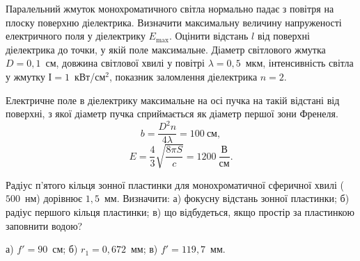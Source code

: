 \begin{problem}%
    Паралельний жмуток монохроматичного світла нормально падає з повітря на плоску поверхню діелектрика. Визначити максимальну величину напруженості електричного поля у діелектрику $E_{\max}$. Оцінити відстань $l$ від поверхні діелектрика до точки, у якій поле максимальне. Діаметр світлового жмутка $D = 0,1$~см, довжина світлової хвилі у повітрі $\lambda = 0,5$~мкм, інтенсивність світла у жмутку $І = 1$~кВт/см$^2$, показник заломлення діелектрика $n = 2$.
    \begin{solution}
        Електричне поле в діелектрику максимальне на осі пучка на такій відстані від поверхні, з якої діаметр пучка сприймається як діаметр першої зони Френеля.
        \begin{equation*}
            b = \frac{D^2n}{4\lambda} = 100\ \text{см},
        \end{equation*}
        \begin{equation*}
            E = \frac43 \sqrt{\frac{8\pi S}{c}} = 1200\ \frac{\text{В}}{\text{см}}.
        \end{equation*}
    \end{solution}
\end{problem}


\begin{problem}%
    Радіус п'ятого кільця зонної пластинки для монохроматичної сферичної хвилі ($500$~нм) дорівнює $1,5$~мм. Визначити: а) фокусну відстань зонної пластинки; б) радіус першого кільця пластинки; в) що відбудеться, якщо простір за пластинкою заповнити водою?
    \begin{solution}
        а) $ f' = 90 $~см; б) $ r_1 = 0,672 $~мм; в) $ f' =119,7 $~мм.
    \end{solution}
\end{problem}


